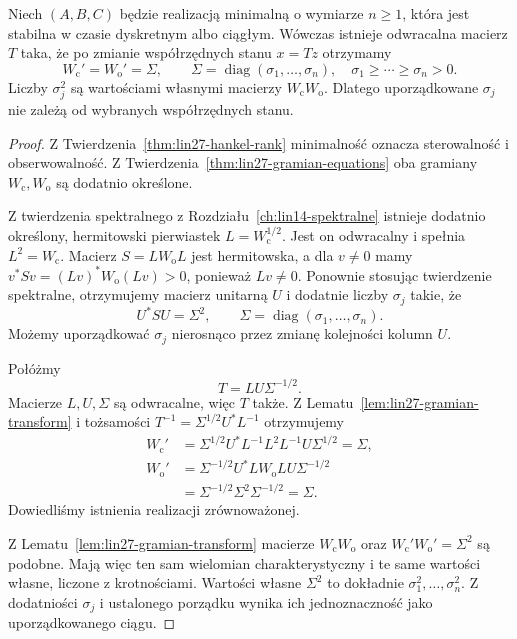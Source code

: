 \begin{twierdzenie}
\label{thm:lin27-balancing}
Niech \((A,B,C)\)
będzie realizacją minimalną
o wymiarze \(n\ge1\),
która jest stabilna
w czasie dyskretnym
albo ciągłym.
Wówczas istnieje
odwracalna macierz \(T\)
taka, że po zmianie
współrzędnych stanu
\(x=Tz\) otrzymamy
\[
 W_{\mathrm c}'=
 W_{\mathrm o}'=
 \Sigma,\qquad
 \Sigma=
 \operatorname{diag}
 (\sigma_1,\ldots,\sigma_n),
 \quad
 \sigma_1\ge\cdots\ge
 \sigma_n>0.
\]
Liczby \(\sigma_j^2\)
są wartościami własnymi
macierzy \(W_{\mathrm c}W_{\mathrm o}\).
Dlatego uporządkowane
\(\sigma_j\) nie zależą
od wybranych współrzędnych
stanu.
\end{twierdzenie}
\begin{proof}
Z
Twierdzenia~\ref{thm:lin27-hankel-rank}
minimalność oznacza
sterowalność i obserwowalność.
Z
Twierdzenia~\ref{thm:lin27-gramian-equations}
oba gramiany
\(W_{\mathrm c},W_{\mathrm o}\)
są dodatnio określone.

Z twierdzenia spektralnego
z
Rozdziału~\ref{ch:lin14-spektralne}
istnieje dodatnio określony,
hermitowski pierwiastek
\(L=W_{\mathrm c}^{1/2}\).
Jest on odwracalny
i spełnia \(L^2=W_{\mathrm c}\).
Macierz
\(S=LW_{\mathrm o}L\)
jest hermitowska,
a dla \(v\ne0\)
mamy
\(v^*Sv=(Lv)^*W_{\mathrm o}(Lv)>0\),
ponieważ \(Lv\ne0\).
Ponownie stosując
twierdzenie spektralne,
otrzymujemy macierz unitarną \(U\)
i dodatnie liczby \(\sigma_j\)
takie, że
\[
 U^*SU=\Sigma^2,\qquad
 \Sigma=\operatorname{diag}
 (\sigma_1,\ldots,\sigma_n).
\]
Możemy uporządkować
\(\sigma_j\) nierosnąco
przez zmianę kolejności
kolumn \(U\).

Połóżmy
\[
 T=LU\Sigma^{-1/2}.
\]
Macierze \(L,U,\Sigma\)
są odwracalne,
więc \(T\) także.
Z
Lematu~\ref{lem:lin27-gramian-transform}
i tożsamości
\(T^{-1}=\Sigma^{1/2}U^*L^{-1}\)
otrzymujemy
\[
 \begin{aligned}
 W_{\mathrm c}'
 &=\Sigma^{1/2}U^*L^{-1}
      L^2L^{-1}U\Sigma^{1/2}
   =\Sigma,\\
 W_{\mathrm o}'
 &=\Sigma^{-1/2}U^*
      LW_{\mathrm o}LU\Sigma^{-1/2}\\
 &=\Sigma^{-1/2}
      \Sigma^2\Sigma^{-1/2}
   =\Sigma.
 \end{aligned}
\]
Dowiedliśmy istnienia
realizacji zrównoważonej.

Z
Lematu~\ref{lem:lin27-gramian-transform}
macierze
\(W_{\mathrm c}W_{\mathrm o}\)
oraz
\(W_{\mathrm c}'W_{\mathrm o}'
 =\Sigma^2\)
są podobne.
Mają więc ten sam
wielomian charakterystyczny
i te same wartości własne,
liczone z krotnościami.
Wartości własne
\(\Sigma^2\) to dokładnie
\(\sigma_1^2,\ldots,\sigma_n^2\).
Z dodatniości \(\sigma_j\)
i ustalonego porządku
wynika ich jednoznaczność
jako uporządkowanego ciągu.
\end{proof}

